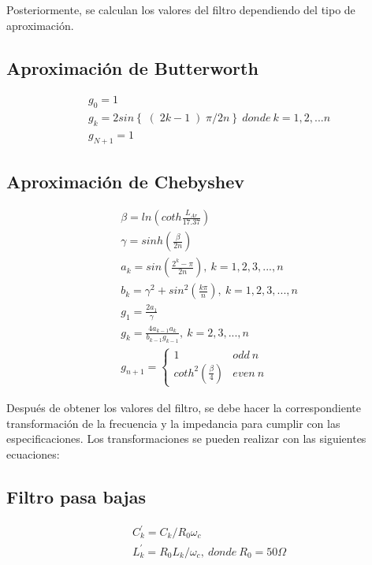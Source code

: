 Posteriormente, se calculan los valores del filtro dependiendo del tipo de aproximación.


\subsection*{Aproximación de Butterworth}
\begin{subequations}
    \begin{align}
        & g_{0} = 1 \\
        & g_{k} = 2 sin\left\{ \right( 2k - 1 \left) \pi / 2n \right\}~donde~k=1,2,...n \\
        & g_{N + 1} = 1
    \end{align}
\end{subequations}


\subsection*{Aproximación de Chebyshev}
\begin{subequations}
    \begin{align}
        & \beta = ln \left( coth \frac{L_{Ar}}{17.37} \right) \\
        & \gamma = sinh \left( \frac{\beta}{2n} \right) \\
        & a_{k} = sin\left( \frac{2^{k} - \pi}{2n} \right),~k=1,2,3,...,n \\
        & b_{k} = \gamma^{2} + sin^{2}\left( \frac{k \pi}{n} \right),~k=1,2,3,...,n \\
        & g_{1} = \frac{2 a_{1}}{\gamma} \\
        & g_{k} = \frac{4 a_{k - 1} a_{k}}{b_{k - 1} g_{k - 1}},~k=2,3,...,n \\
        & g_{n+1} =
        \begin{cases}
            1 & odd~n \\
            coth^2(\frac{\beta}{4}) & even~n
        \end{cases}
    \end{align}
\end{subequations}

Después de obtener los valores del filtro, se debe hacer la correspondiente transformación de la frecuencia y la impedancia para cumplir con las especificaciones. Los transformaciones se pueden realizar con las siguientes ecuaciones:

\subsection*{Filtro pasa bajas}
\begin{subequations}
    \begin{align}
        & C_{k}^{'} = C_{k} / R_{0} \omega_{c} \\
        & L_{k}^{'} = R_{0} L_{k} / \omega_{c},~donde~R_{0} = 50 \Omega
    \end{align}
\end{subequations}



